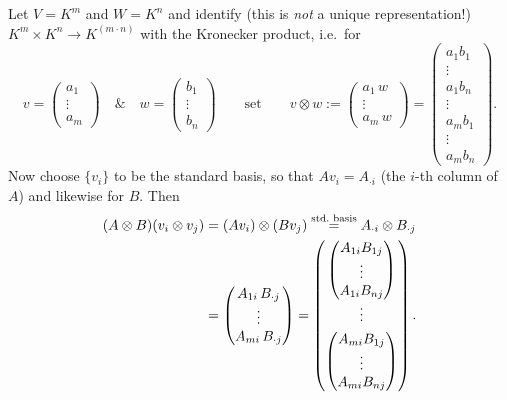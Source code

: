 \documentclass[../../main.tex]{subfiles}
\begin{document}
Let $V=K^{m}$ and $W=K^{n}$ and identify (this is \emph{not} a unique representation!)
$K^{m}\times K^{n}\to K^{(m\cdot n)}$ with the Kronecker product, i.e.\ for
\begin{equation}
v=\begin{pmatrix}a_1\\\vdots\\a_m\end{pmatrix}\quad\&\quad
w=\begin{pmatrix}b_1\\\vdots\\b_n\end{pmatrix}
\qquad\text{set}\qquad
v\otimes w:=\begin{pmatrix}a_1\,w\\\vdots\\a_m\,w\end{pmatrix}
=\begin{pmatrix}a_1 b_1\\\vdots\\a_1 b_n\\\vdots\\a_m b_1\\\vdots\\a_m b_n\end{pmatrix}.
\end{equation}
Now choose $\{v_i\}$ to be the standard basis, so that $Av_i=A_{\cdot i}$ (the $i$-th column
of $A$) and likewise for $B$. Then
\begin{align}
(A\otimes B)(v_i\otimes v_j)
&=(Av_i)\otimes(Bv_j)
\overset{\text{std.\ basis}}{=}A_{\cdot i}\otimes B_{\cdot j}\notag\\
&=\begin{pmatrix}A_{1i}\,B_{\cdot j}\\\vdots\\A_{mi}\,B_{\cdot j}\end{pmatrix}
=\begin{pmatrix}
\begin{pmatrix}A_{1i}B_{1j}\\\vdots\\A_{1i}B_{nj}\end{pmatrix}\\[1.2em]
\vdots\\[0.4em]
\begin{pmatrix}A_{mi}B_{1j}\\\vdots\\A_{mi}B_{nj}\end{pmatrix}
\end{pmatrix}.
\end{align}
\end{document}
